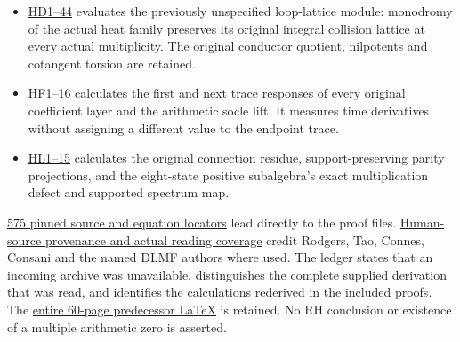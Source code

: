 \documentclass[
]{article}
\providecommand{\tightlist}{%
  \setlength{\itemsep}{0pt}\setlength{\parskip}{0pt}}
\begin{document}
\begin{itemize}
\tightlist
\item
  \href{https://github.com/KokunoYumeto/zeta-function-research-reader/blob/54635658c374977ea4390f4d34bf412dfc9c155d/workbenches/splitzero-tandem/continuations/20260923-original-heat-integral-monodromy/HEAT_MONODROMY_LATTICE_DEFECT.tex}{HD1--44}
  evaluates the previously unspecified loop-lattice module: monodromy of
  the actual heat family preserves its original integral collision
  lattice at every actual multiplicity. The original conductor quotient,
  nilpotents and cotangent torsion are retained.
\item
  \href{https://github.com/KokunoYumeto/zeta-function-research-reader/blob/54635658c374977ea4390f4d34bf412dfc9c155d/workbenches/splitzero-tandem/continuations/20260923-original-heat-integral-monodromy/HEAT_TRACE_FLAG_RESPONSE.tex}{HF1--16}
  calculates the first and next trace responses of every original
  coefficient layer and the arithmetic socle lift. It measures time
  derivatives without assigning a different value to the endpoint trace.
\item
  \href{https://github.com/KokunoYumeto/zeta-function-research-reader/blob/54635658c374977ea4390f4d34bf412dfc9c155d/workbenches/splitzero-tandem/continuations/20260923-original-heat-integral-monodromy/HEAT_LATTICE_RECEIVER.tex}{HL1--15}
  calculates the original connection residue, support-preserving parity
  projections, and the eight-state positive subalgebra's exact
  multiplication defect and supported spectrum map.
\end{itemize}

\href{PINNED_PROOF_LINKS.json}{575 pinned source and equation locators}
lead directly to the proof files.
\href{https://github.com/KokunoYumeto/zeta-function-research-reader/blob/54635658c374977ea4390f4d34bf412dfc9c155d/workbenches/splitzero-tandem/continuations/20260923-original-heat-integral-monodromy/SOURCE_READING_AND_USE.json}{Human-source
provenance and actual reading coverage} credit Rodgers, Tao, Connes,
Consani and the named DLMF authors where used. The ledger states that an
incoming archive was unavailable, distinguishes the complete supplied
derivation that was read, and identifies the calculations rederived in
the included proofs. The
\href{https://github.com/KokunoYumeto/zeta-function-research-reader/blob/54635658c374977ea4390f4d34bf412dfc9c155d/workbenches/splitzero-tandem/continuations/20260923-original-heat-integral-monodromy/RETAINED_HEAT_COLLISION_PROOFS.tex}{entire
60-page predecessor LaTeX} is retained. No RH conclusion or existence of
a multiple arithmetic zero is asserted.
\end{document}
